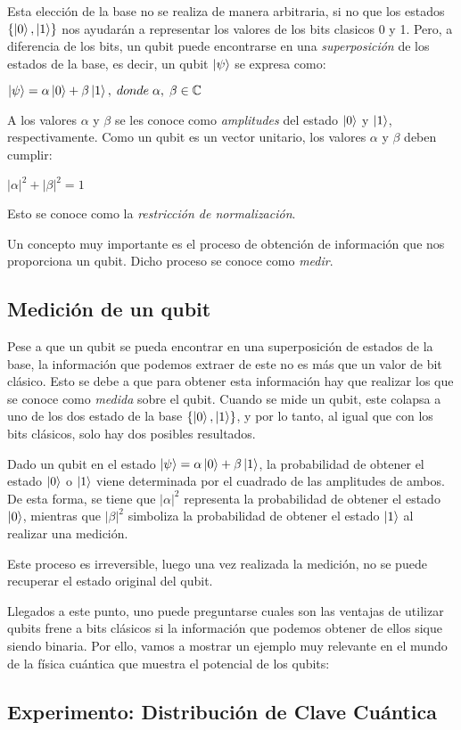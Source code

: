 Esta elección de la base no se realiza de manera arbitraria, si no que los estados $\{\left|0\right\rangle,\left|1\right\rangle\}$ nos ayudarán a representar los valores de los bits clasicos 0 y 1. Pero, a diferencia de los bits, un qubit puede encontrarse en una \textit{superposición} de los estados de la base, es decir, un qubit $\left|\psi\right\rangle$ se expresa como:
\begin{center}
$\left|\psi\right\rangle=\alpha\left|0\right\rangle+\beta\left|1\right\rangle,\; donde\; \alpha,\;\beta\in\mathbb{C}$ 
\end{center}

A los valores $\alpha$ y $\beta$ se les conoce como \textit{amplitudes} del estado $\left|0\right\rangle$ y $\left|1\right\rangle$, respectivamente. Como un qubit es un vector unitario, los valores $\alpha$ y $\beta$ deben cumplir:
\begin{center}
$|\alpha|^2 + |\beta|^2 = 1$
\end{center}

Esto se conoce como la \textit{restricción de normalización}.

Un concepto muy importante es el proceso de obtención de información que nos proporciona un qubit. Dicho proceso se conoce como \textit{medir}.

\subsection{Medición de un qubit}

Pese a que un qubit se pueda encontrar en una superposición de estados de la base, la información que podemos extraer de este no es más que un valor de bit clásico. Esto se debe a que para obtener esta información hay que realizar los que se conoce como \textit{medida} sobre el qubit. Cuando se mide un qubit, este colapsa a uno de los dos estado de la base $\{\left|0\right\rangle,\left|1\right\rangle\}$, y por lo tanto, al igual que con los bits clásicos, solo hay dos posibles resultados.

Dado un qubit en el estado $\left|\psi\right\rangle=\alpha\left|0\right\rangle+\beta\left|1\right\rangle$, la probabilidad de obtener el estado $\left|0\right\rangle$ o $\left|1\right\rangle$ viene determinada por el cuadrado de las amplitudes de ambos. De esta forma, se tiene que $|\alpha|^2$ representa la probabilidad de obtener el estado $\left|0\right\rangle$, mientras que $|\beta|^2$ simboliza la probabilidad de obtener el estado $\left|1\right\rangle$ al realizar una medición.

Este proceso es irreversible, luego una vez realizada la medición, no se puede recuperar el estado original del qubit.

Llegados a este punto, uno puede preguntarse cuales son las ventajas de utilizar qubits frene a bits clásicos si la información que podemos obtener de ellos sique siendo binaria. Por ello, vamos a mostrar un ejemplo muy relevante en el mundo de la física cuántica que muestra el potencial de los qubits:

\subsection{Experimento: Distribución de Clave Cuántica}


